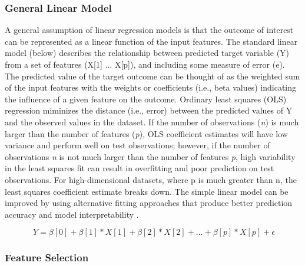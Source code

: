 \documentclass[sigconf]{acmart}
\begin{document}
\subsubsection{General Linear Model} 

A general assumption of linear regression models is that the outcome of interest
can be represented as a linear function of the input features. The standard 
linear model (below) describes the relationship between predicted target 
variable (Y) from a set of features (X[1] ... X[p]), and including some measure 
of error (e). The predicted value of the target outcome can be thought of as 
the weighted sum of the input features with the weights or coefficients 
(i.e., beta values) indicating the influence of a given feature on the outcome. 
Ordinary least squares (OLS) regression miminizes the distance (i.e., error) 
between the predicted values of Y and the observed values in the dataset. 
If the number of observations (\textit{n}) is much larger than the number of 
features (\textit{p}), OLS coefficient estimates will have low variance and 
perform well on test observations; however, if the number of observations 
\textit{n} is not much larger than the number of features \textit{p}, high 
variability in the least squares fit can result in overfitting and poor 
prediction on test observations. For high-dimensional datasets, where p is much 
greater than n, the least squares coefficient estimate breaks down. The simple 
linear model can be improved by using alternative fitting approaches that produce 
better prediction accuracy and model interpretability \cite{jamesetal13}. 

\begin{equation}
  \ Y = \beta[0] + \beta[1]*X[1] + \beta[2]*X[2] +... + \beta[p]*X[p] + \epsilon
\end{equation}


\subsubsection{Feature Selection} 
\end{document}
